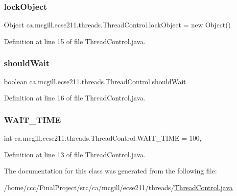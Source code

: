 \subsubsection{\texorpdfstring{lock\+Object}{lockObject}}
{\footnotesize\ttfamily Object ca.\+mcgill.\+ecse211.\+threads.\+Thread\+Control.\+lock\+Object = new Object()\hspace{0.3cm}{\ttfamily [protected]}}



Definition at line 15 of file Thread\+Control.\+java.

\mbox{\label{classca_1_1mcgill_1_1ecse211_1_1threads_1_1_thread_control_a8252930dab1b067da64cf2afae4fc630}} 
\subsubsection{\texorpdfstring{should\+Wait}{shouldWait}}
{\footnotesize\ttfamily boolean ca.\+mcgill.\+ecse211.\+threads.\+Thread\+Control.\+should\+Wait\hspace{0.3cm}{\ttfamily [protected]}}



Definition at line 16 of file Thread\+Control.\+java.

\mbox{\label{classca_1_1mcgill_1_1ecse211_1_1threads_1_1_thread_control_a395cfe1d73b3ef14da0830ed0a499f82}} 
\subsubsection{\texorpdfstring{W\+A\+I\+T\+\_\+\+T\+I\+ME}{WAIT\_TIME}}
{\footnotesize\ttfamily int ca.\+mcgill.\+ecse211.\+threads.\+Thread\+Control.\+W\+A\+I\+T\+\_\+\+T\+I\+ME = 100\hspace{0.3cm}{\ttfamily [static]}, {\ttfamily [protected]}}



Definition at line 13 of file Thread\+Control.\+java.



The documentation for this class was generated from the following file\+:\begin{DoxyCompactItemize}
\item 
/home/ccc/\+Final\+Project/src/ca/mcgill/ecse211/threads/\hyperlink{_thread_control_8java}{Thread\+Control.\+java}\end{DoxyCompactItemize}
